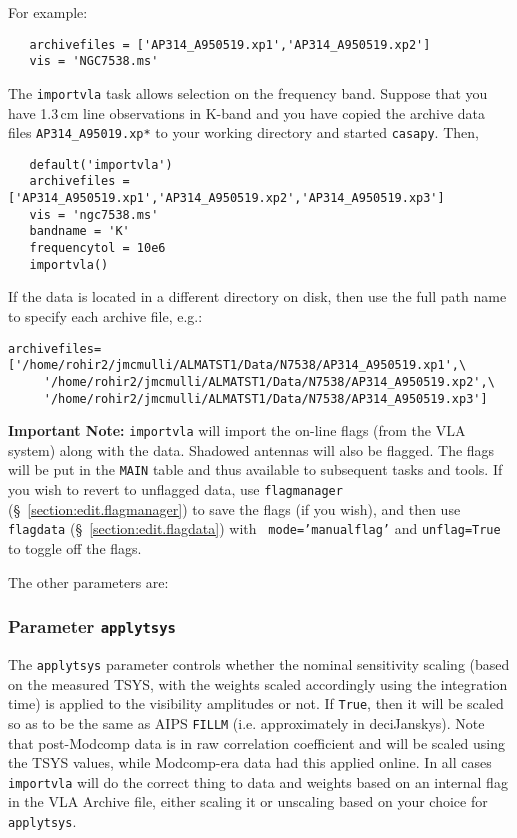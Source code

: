 For example:
\small
\begin{verbatim}
   archivefiles = ['AP314_A950519.xp1','AP314_A950519.xp2']
   vis = 'NGC7538.ms'
\end{verbatim}
\normalsize

The {\tt importvla} task allows selection on the frequency band.
Suppose that you have 1.3\,cm line observations in K-band and you
have copied the archive data files {\tt AP314\_A95019.xp*} to your 
working directory and started {\tt casapy}.  Then,
\small
\begin{verbatim}
   default('importvla')
   archivefiles = ['AP314_A950519.xp1','AP314_A950519.xp2','AP314_A950519.xp3']
   vis = 'ngc7538.ms' 
   bandname = 'K' 
   frequencytol = 10e6
   importvla()
\end{verbatim}
\normalsize
If the data is located in a different directory on disk, then use the
full path name to specify each archive file, e.g.:
\small
\begin{verbatim}
archivefiles=['/home/rohir2/jmcmulli/ALMATST1/Data/N7538/AP314_A950519.xp1',\
     '/home/rohir2/jmcmulli/ALMATST1/Data/N7538/AP314_A950519.xp2',\
     '/home/rohir2/jmcmulli/ALMATST1/Data/N7538/AP314_A950519.xp3']
\end{verbatim}
\normalsize

{\bf Important Note:} {\tt importvla} will import the on-line flags
(from the VLA system) along with the data. Shadowed antennas will also
be flagged. The flags will be put in the {\tt MAIN} table and thus
available to subsequent tasks and tools.  If you wish to revert to
unflagged data, use {\tt flagmanager}
(\S~\ref{section:edit.flagmanager}) to save the flags (if you wish),
and then use {\tt flagdata} (\S~\ref{section:edit.flagdata}) with {\tt
  mode='manualflag'} and {\tt unflag=True} to toggle off the flags.

The other parameters are:

\subsubsection{Parameter {\tt applytsys} }
\label{section:io.import.vla.applytsys}

The {\tt applytsys} parameter controls whether the nominal sensitivity
scaling (based on the measured TSYS, with the weights scaled
accordingly using the integration time) is
applied to the visibility amplitudes or not.  If {\tt True}, then it
will be scaled so as to be the same as AIPS {\tt FILLM}
(i.e. approximately in deciJanskys).
Note that post-Modcomp data is in raw correlation coefficient and will
be scaled using the TSYS values, while Modcomp-era data had this
applied online.  
In all cases {\tt importvla} will do
the correct thing to data and weights based on an internal flag in the
VLA Archive file, either scaling it or unscaling based on your choice
for {\tt applytsys}.

